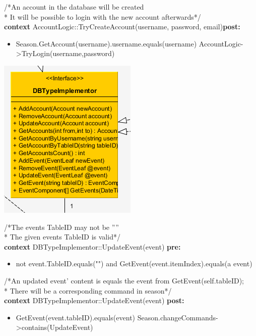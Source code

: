 \documentclass[a4paper]{article}
\begin{document}
\noindent
/*An account in the database will be created\\
* It will be possible to login with the new account afterwards*/\\   
\textbf{context} AccountLogic::TryCreateAccount(username, password, email)\textbf{post:}
\begin{itemize}[noitemsep,nolistsep]
\item[] Season.GetAccount(username).username.equals(username)
\subitem AccountLogic->TryLogin(username,password)\\
\end{itemize}


\includegraphics[scale = 1]{IMPLEMENTOR.png}

\noindent
/*The events TableID may not be ''''\\
* The given events TableID is valid*/\\
\textbf{context} DBTypeImplementor::UpdateEvent(event) \textbf{pre:}
\begin{itemize}[noitemsep,nolistsep]
\item[] not event.TableID.equals("") and
\subitem GetEvent(event.itemIndex).equals(a event)\\
\end{itemize}

\noindent
/*An updated event' content is equals the event from GetEvent(self.tableID);\\
* There will be a corresponding command in season*/\\   
\textbf{context} DBTypeImplementor::UpdateEvent(event) \textbf{post:}
\begin{itemize}[noitemsep,nolistsep]
\item[] GetEvent(event.tableID).equals(event)
\subitem Season.changeCommands->contains(UpdateEvent)\\
\end{itemize}
\end{document}
